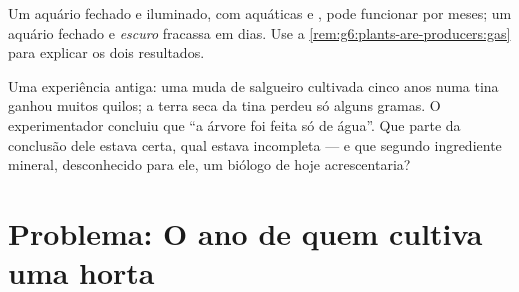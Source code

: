 \begin{exercise}[$\star\star$]\label{exo:g6:plants-are-producers:11}
Um aquário fechado e iluminado, com  aquáticas e , pode
funcionar por meses; um aquário fechado e \emph{escuro} fracassa em
dias. Use a \cref{rem:g6:plants-are-producers:gas} para explicar os
dois resultados.
\end{exercise}

\begin{exercise}[$\star\star\star$]\label{exo:g6:plants-are-producers:12}
Uma experiência antiga: uma muda de salgueiro cultivada cinco anos
numa tina ganhou muitos quilos; a terra seca da tina perdeu só alguns
gramas. O experimentador concluiu que ``a árvore foi feita só de
água''. Que parte da conclusão dele estava certa, qual estava
incompleta --- e que segundo ingrediente mineral, desconhecido para
ele, um biólogo de hoje acrescentaria?
\end{exercise}

\section{Problema: O ano de quem cultiva uma horta}

